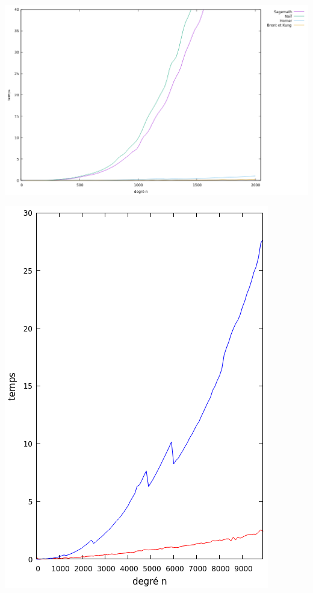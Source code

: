 \documentclass[10pt,a4paper]{beamer}
\begin{document}
\begin{frame}
    \includegraphics[width=1\linewidth]{comp.png}
\end{frame}

\begin{frame}
    \includegraphics[width=1\linewidth]{comp_2.png}
\end{frame}
\end{document}
